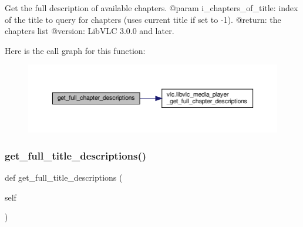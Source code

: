 \begin{DoxyVerb}Get the full description of available chapters.
@param i_chapters_of_title: index of the title to query for chapters (uses current title if set to -1).
@return: the chapters list
@version: LibVLC 3.0.0 and later.
\end{DoxyVerb}
 Here is the call graph for this function\+:
\nopagebreak
\begin{figure}[H]
\begin{center}
\leavevmode
\includegraphics[width=350pt]{classvlc_1_1_media_player_a8c7d9546a94507e0046488e6159d8ffc_cgraph}
\end{center}
\end{figure}
\mbox{\label{classvlc_1_1_media_player_a13b7b90ec73fb26fadf694e95c06659e}} 
\subsubsection{\texorpdfstring{get\+\_\+full\+\_\+title\+\_\+descriptions()}{get\_full\_title\_descriptions()}}
{\footnotesize\ttfamily def get\+\_\+full\+\_\+title\+\_\+descriptions (\begin{DoxyParamCaption}\item[{}]{self }\end{DoxyParamCaption})}

